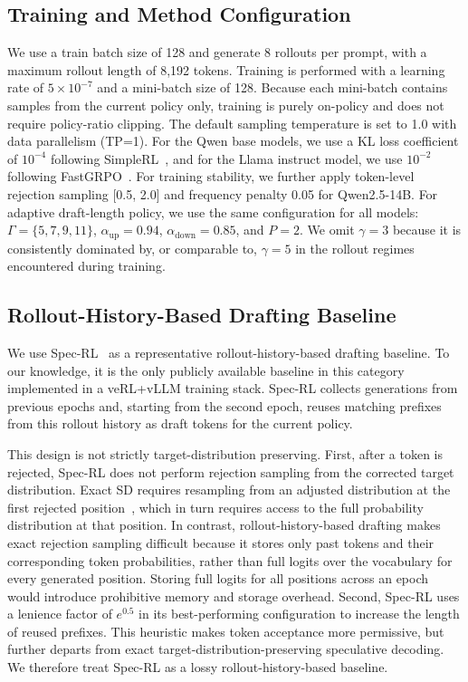 \documentclass{llmxive}
\providecommand{\adaptivepolicy}{adaptive draft-length policy}
\begin{document}
\subsection{Training and Method Configuration}
\label{app:training_method_config}

We use a train batch size of 128 and generate 8 rollouts per prompt, with a maximum rollout length of 8,192 tokens.
Training is performed with a learning rate of $5\times 10^{-7}$ and a mini-batch size of 128.
Because each mini-batch contains samples from the current policy only, training is purely on-policy and does not require policy-ratio clipping.
The default sampling temperature is set to 1.0 with data parallelism (TP=1).
For the Qwen base models, we use a KL loss coefficient of $10^{-4}$ following SimpleRL~\citep{zeng2025simplerl}, and for the Llama instruct model, we use $10^{-2}$ following FastGRPO~\citep{zhang2025fastgrpo}.
For training stability, we further apply token-level rejection sampling [0.5, 2.0] and frequency penalty 0.05 for Qwen2.5-14B.
For \adaptivepolicy{}, we use the same configuration for all models: $\Gamma=\{5,7,9,11\}$, $\alpha_{\mathrm{up}}=0.94$, $\alpha_{\mathrm{down}}=0.85$, and $P=2$.
We omit $\gamma=3$ because it is consistently dominated by, or comparable to, $\gamma=5$ in the rollout regimes encountered during training.


\subsection{Rollout-History-Based Drafting Baseline}
\label{app:history_drafting}

We use Spec-RL~\cite{liu2025spec} as a representative rollout-history-based drafting baseline.
To our knowledge, it is the only publicly available baseline in this category implemented in a veRL+vLLM training stack.
Spec-RL collects generations from previous epochs and, starting from the second epoch, reuses matching prefixes from this rollout history as draft tokens for the current policy.

This design is not strictly target-distribution preserving.
First, after a token is rejected, Spec-RL does not perform rejection sampling from the corrected target distribution.
Exact SD requires resampling from an adjusted distribution at the first rejected position~\cite{leviathan2023fast}, which in turn requires access to the full probability distribution at that position.
In contrast, rollout-history-based drafting makes exact rejection sampling difficult because it stores only past tokens and their corresponding token probabilities, rather than full logits over the vocabulary for every generated position.
Storing full logits for all positions across an epoch would introduce prohibitive memory and storage overhead.
Second, Spec-RL uses a lenience factor of $e^{0.5}$ in its best-performing configuration to increase the length of reused prefixes.
This heuristic makes token acceptance more permissive, but further departs from exact target-distribution-preserving speculative decoding.
We therefore treat Spec-RL as a lossy rollout-history-based baseline.
\end{document}

